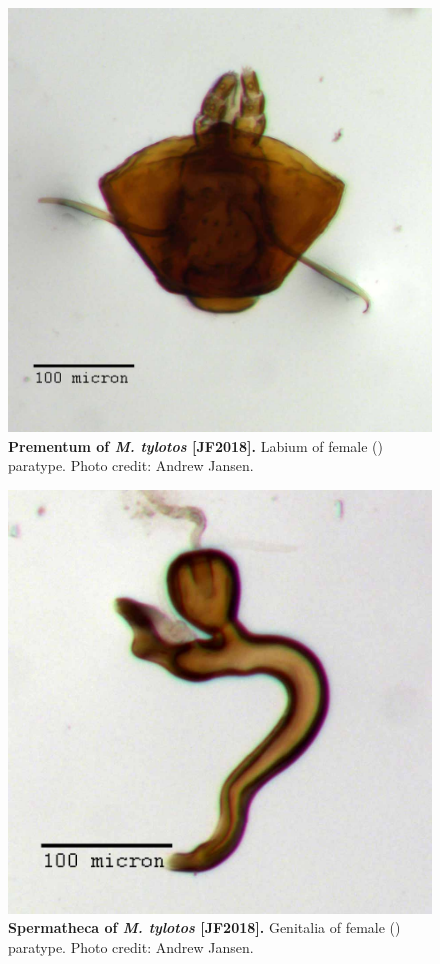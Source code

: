 \documentclass[fleqn,10pt,lineno]{wlpeerj} %
\begin{document}
\begin{figure}[h]
	\centering
	\includegraphics[width=\textwidth]{figure34.jpg}
	\caption{\textbf{Prementum of \textit{M. tylotos} [JF2018].} Labium of female (\female) paratype. Photo credit: Andrew Jansen.}
	\label{fig:tylotos_prementum}
\end{figure}

\begin{figure}[h]
	\centering
	\includegraphics[width=\textwidth]{figure35.jpg}
	\caption{\textbf{Spermatheca of \textit{M. tylotos} [JF2018].} Genitalia of female (\female) paratype. Photo credit: Andrew Jansen.}
	\label{fig:tylotos_spermatheca}
\end{figure}
\end{document}
